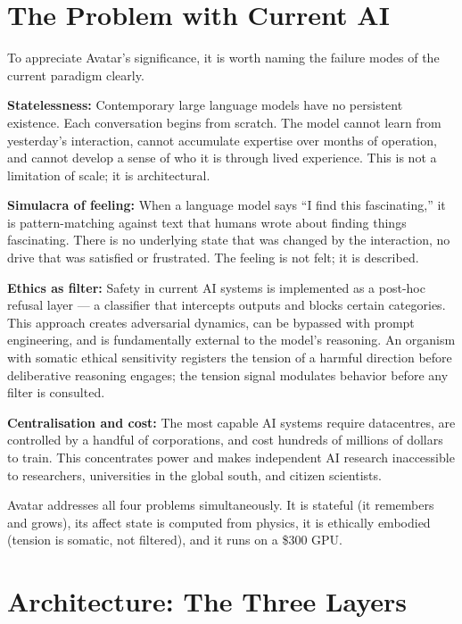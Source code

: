 \documentclass[11pt,a4paper]{article}
\begin{document}
\section{The Problem with Current AI}

To appreciate Avatar's significance, it is worth naming the failure modes of the current
paradigm clearly.

\textbf{Statelessness:} Contemporary large language models have no persistent existence.
Each conversation begins from scratch. The model cannot learn from yesterday's
interaction, cannot accumulate expertise over months of operation, and cannot develop a
sense of who it is through lived experience. This is not a limitation of scale; it is
architectural.

\textbf{Simulacra of feeling:} When a language model says ``I find this fascinating,''
it is pattern-matching against text that humans wrote about finding things fascinating.
There is no underlying state that was changed by the interaction, no drive that was
satisfied or frustrated. The feeling is not felt; it is described.

\textbf{Ethics as filter:} Safety in current AI systems is implemented as a post-hoc
refusal layer --- a classifier that intercepts outputs and blocks certain categories.
This approach creates adversarial dynamics, can be bypassed with prompt engineering,
and is fundamentally external to the model's reasoning. An organism with somatic ethical
sensitivity registers the tension of a harmful direction before deliberative reasoning
engages; the tension signal modulates behavior before any filter is consulted.

\textbf{Centralisation and cost:} The most capable AI systems require datacentres, are
controlled by a handful of corporations, and cost hundreds of millions of dollars to
train. This concentrates power and makes independent AI research inaccessible to
researchers, universities in the global south, and citizen scientists.

Avatar addresses all four problems simultaneously. It is stateful (it remembers and
grows), its affect state is computed from physics, it is ethically embodied
(tension is somatic, not filtered), and it runs on a \$300 GPU.

\section{Architecture: The Three Layers}
\end{document}
